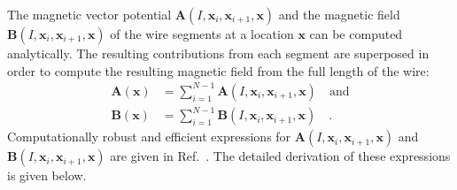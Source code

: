 The magnetic vector potential $\mathbf{A}(I, \mathbf{x}_i, \mathbf{x}_{i+1}, \mathbf{x})$ and the magnetic field $\mathbf{B}(I, \mathbf{x}_i, \mathbf{x}_{i+1}, \mathbf{x})$
of the wire segments at a location $\mathbf{x}$ can be computed analytically.
The resulting contributions from each segment are superposed in order to compute the resulting magnetic field from the full length of the wire:
\begin{align}
 \mathbf{A}(\mathbf{x}) & = \sum_{i=1}^{N-1} \mathbf{A}(I, \mathbf{x}_i, \mathbf{x}_{i+1}, \mathbf{x}) \quad \mathrm{and} \\
 \mathbf{B}(\mathbf{x}) & = \sum_{i=1}^{N-1} \mathbf{B}(I, \mathbf{x}_i, \mathbf{x}_{i+1}, \mathbf{x}) \quad .
\end{align}
Computationally robust and efficient expressions for
$\mathbf{A}(I, \mathbf{x}_i, \mathbf{x}_{i+1}, \mathbf{x})$ and
$\mathbf{B}(I, \mathbf{x}_i, \mathbf{x}_{i+1}, \mathbf{x})$
are given in Ref.~\cite{hanson_hirshman_2002}.
The detailed derivation of these expressions is given below.




